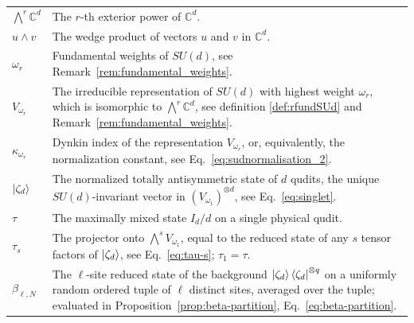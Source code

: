 \documentclass[11pt,letterpaper]{article}
\theoremstyle{plain}
\theoremstyle{plain}
\theoremstyle{plain}
\theoremstyle{plain}
\theoremstyle{plain}
\theoremstyle{plain}
\theoremstyle{plain}
\theoremstyle{definition}
\theoremstyle{plain}
\begin{document}
\begin{tabular}{@{}ll@{}}

\parbox[t]{0.22\textwidth}{$\bigwedge^r \mathbb{C}^d$} & \parbox[t]{0.72\textwidth}{The $r$-th exterior power of $\mathbb{C}^d$.} \\[0.6em]

\parbox[t]{0.22\textwidth}{$u \wedge v$} & \parbox[t]{0.72\textwidth}{The wedge product of vectors $u$ and $v$ in $\mathbb{C}^d$.} \\[0.6em]

\parbox[t]{0.22\textwidth}{$\omega_r$} & \parbox[t]{0.72\textwidth}{Fundamental weights of $SU(d)$, see Remark~\ref{rem:fundamental_weights}.} \\[0.6em]

\parbox[t]{0.22\textwidth}{$V_{\omega_r}$} & \parbox[t]{0.72\textwidth}{The irreducible representation of $SU(d)$ with highest weight $\omega_r$, which is isomorphic to $\bigwedge^r \mathbb{C}^d$, see definition \ref{def:rfundSUd} and Remark~\ref{rem:fundamental_weights}.} \\[0.6em]

\parbox[t]{0.22\textwidth}{$\kappa_{\omega_r}$} & \parbox[t]{0.72\textwidth}{Dynkin index of the representation $V_{\omega_r}$, or, equivalently, the normalization constant, see Eq.~\eqref{eq:sudnormalisation_2}.} \\[0.6em]

\parbox[t]{0.22\textwidth}{$\ket{\zeta_d}$} & \parbox[t]{0.72\textwidth}{The normalized totally antisymmetric state of $d$ qudits, the unique $SU(d)$-invariant vector in $(V_{\omega_1})^{\otimes d}$, see Eq.~\eqref{eq:singlet}.} \\[0.6em]

\parbox[t]{0.22\textwidth}{$\tau$} & \parbox[t]{0.72\textwidth}{The maximally mixed state $I_d/d$ on a single physical qudit.} \\[0.6em]

\parbox[t]{0.22\textwidth}{$\tau_s$} & \parbox[t]{0.72\textwidth}{The projector onto $\bigwedge^sV_{\omega_1}$, equal to the reduced state of any $s$ tensor factors of $\ket{\zeta_d}$, see Eq.~\eqref{eq:tau-s}; $\tau_1=\tau$.} \\[0.6em]

\parbox[t]{0.22\textwidth}{$\beta_{\ell,N}$} & \parbox[t]{0.72\textwidth}{The $\ell$-site reduced state of the background $\ket{\zeta_d}\bra{\zeta_d}^{\otimes q}$ on a uniformly random ordered tuple of $\ell$ distinct sites, averaged over the tuple; evaluated in Proposition~\ref{prop:beta-partition}, Eq.~\eqref{eq:beta-partition}.} \\[0.6em]

\end{tabular}
\end{document}
